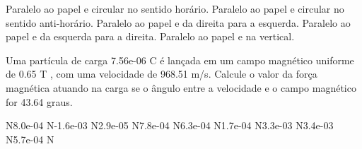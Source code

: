 \documentclass[12pt, addpoints]{exam}
\begin{document}
\begin{questions}
\begin{multicols*}{2}
\begin{choices}
\choice Paralelo ao papel e circular no sentido horário. 
\choice Paralelo ao papel e circular no sentido anti-horário. 
\choice Paralelo ao papel e da direita para a esquerda. 
\choice Paralelo ao papel e da esquerda para a direita. 
\choice Paralelo ao papel e na vertical. 
\end{choices}
\question Uma partícula de carga 7.56e-06 C é lançada em um campo magnético uniforme de    0.65 T , com uma velocidade de 968.51 m/s. Calcule o valor da força magnética atuando na carga se o ângulo entre a velocidade e o campo magnético for   43.64 graus.

\begin{oneparchoices}
 N\choice 8.0e-04 N\choice -1.6e-03 N\choice 2.9e-05 N\choice 7.8e-04 N\choice 6.3e-04 N\choice 1.7e-04 N\choice 3.3e-03 N\choice 3.4e-03 N\choice 5.7e-04 N
\end{oneparchoices}\end{multicols*}
\end{questions}
\newpage
\end{document}
